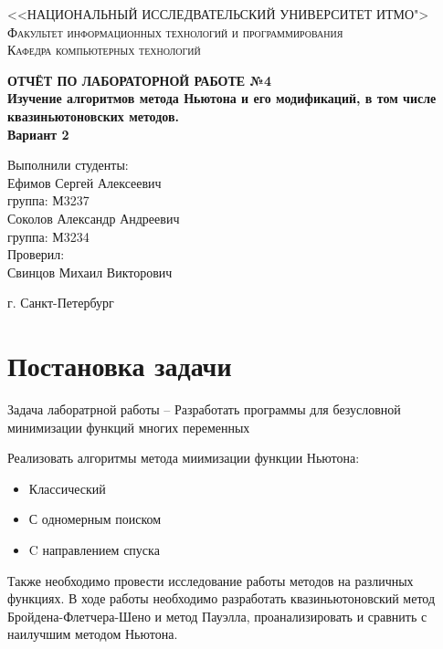\documentclass[a4paper, 14pt]{article}
\begin{document}
	\renewcommand{\chaptername}{Лабораторная работа}
	\def\contentsname{Содержание}

	\begin{titlepage}
		\begin{center}
			\textsc{<<НАЦИОНАЛЬНЫЙ ИССЛЕДВАТЕЛЬСКИЙ УНИВЕРСИТЕТ ИТМО">\\[5mm]
			Факультет информационных технологий и программирования\\[2mm]
			Кафедра компьютерных технологий}

			\vfill

			\textbf{ОТЧЁТ ПО ЛАБОРАТОРНОЙ РАБОТЕ №4\\[3mm]
			Изучение алгоритмов метода Ньютона и его модификаций, в том числе квазиньютоновских методов.\\
			Вариант 2
\\[28mm]
			}
		\end{center}

		\hfill
		\begin{minipage}{.5\textwidth}
			Выполнили студенты:\\[2mm]
			Ефимов Сергей Алексеевич\\
			группа: М3237\\[2mm]
			Соколов Александр Андреевич\\
			группа: М3234\\[5mm]

			Проверил:\\[2mm]
			Свинцов Михаил Викторович
		\end{minipage}%
		\vfill
		\begin{center}
			г. Санкт-Петербург
		\end{center}
	\end{titlepage}


	\section*{Постановка задачи}
	Задача лаборатрной работы  -- Разработать программы для безусловной минимизации функций многих переменных
	
	Реализовать алгоритмы метода миимизации функции Ньютона:
	\begin{itemize}
		\item Классический
		\item С одномерным поиском
		\item C направлением спуска
	\end{itemize}
	Также необходимо провести исследование работы методов на различных функциях.
	В ходе работы необходимо разработать квазиньютоновский метод Бройдена-Флетчера-Шено и метод Пауэлла, проанализировать и сравнить с наилучшим методом Ньютона. 
	
\end{document}
